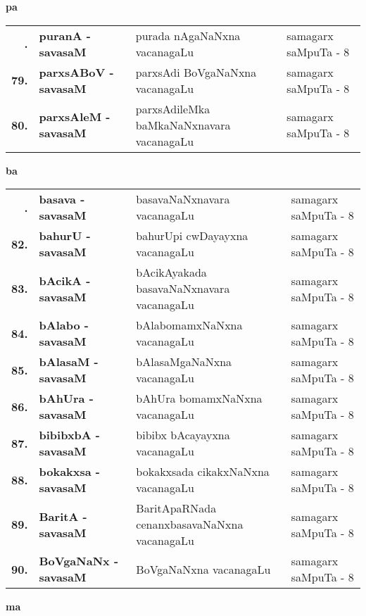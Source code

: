 \centerline{\bf pa}

{\renewcommand{\arraystretch}{1.35}
\begin{longtable}{>{\bf}r>{\bf}l>{\raggedright}p{8cm}l}
\endfirsthead
\endhead
\endfoot
\endlastfoot
78. & puranA - savasaM &  purada nAgaNaNxna vacanagaLu & samagarx saMpuTa - 8\\
79. & parxsABoV - savasaM & parxsAdi BoVgaNaNxna vacanagaLu & samagarx saMpuTa - 8 \\
80. & parxsAleM - savasaM & parxsAdileMka baMkaNaNxnavara vacanagaLu & samagarx saMpuTa - 8
\end{longtable}}

\smallskip

\centerline{\bf ba}

{\renewcommand{\arraystretch}{1.35}
\begin{longtable}{>{\bf}r>{\bf}l>{\raggedright}p{8cm}l}
\endfirsthead
\endhead
\endfoot
\endlastfoot
81. & basava - savasaM & basavaNaNxnavara vacanagaLu & samagarx saMpuTa - 8\\
82. & bahurU - savasaM & bahurUpi cwDayayxna vacanagaLu & samagarx saMpuTa - 8 \\
83. & bAcikA - savasaM & bAcikAyakada basavaNaNxnavara vacanagaLu & samagarx saMpuTa - 8 \\
84. & bAlabo - savasaM & bAlabomamxNaNxna vacanagaLu & samagarx saMpuTa - 8 \\
85. & bAlasaM - savasaM & bAlasaMgaNaNxna vacanagaLu & samagarx saMpuTa - 8 \\
86. & bAhUra - savasaM & bAhUra bomamxNaNxna vacanagaLu & samagarx saMpuTa - 8 \\
87. & bibibxbA - savasaM & bibibx bAcayayxna vacanagaLu & samagarx saMpuTa - 8 \\
88. & bokakxsa - savasaM & bokakxsada cikakxNaNxna vacanagaLu & samagarx saMpuTa - 8 \\
89. & BaritA - savasaM & BaritApaRNada cenanxbasavaNaNxna vacanagaLu & samagarx saMpuTa - 8 \\
90. & BoVgaNaNx - savasaM & BoVgaNaNxna vacanagaLu & samagarx saMpuTa - 8
\end{longtable}}
\smallskip

\centerline{\bf ma}

